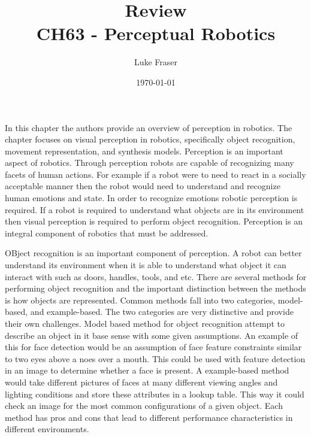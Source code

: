 \documentclass{article}
\begin{document}
\title{{\large Review} \\ CH63 - Perceptual Robotics}
\author{Luke Fraser}
\date{\today}
\maketitle

\begingroup
\renewcommand{\section}[2]{}


\endgroup

\section*{Summary}
In this chapter the authors provide an overview of perception in robotics. The chapter focuses on visual perception in robotics, specifically object recognition, movement representation, and synthesis models. Perception is an important aspect of robotics. Through perception robots are capable of recognizing many facets of human actions. For example if a robot were to need to react in a socially acceptable manner then the robot would need to understand and recognize human emotions and state. In order to recognize emotions robotic perception is required. If a robot is required to understand what objects are in its environment then visual perception is required to perform object recognition. Perception is an integral component of robotics that must be addressed.

OBject recognition is an important component of perception. A robot can better understand its environment when it is able to understand what object it can interact with such as doors, handles, tools, and etc. There are several methods for performing object recognition and the important distinction between the methods is how objects are represented. Common methods fall into two categories, model-based, and example-based. The two categories are very distinctive and provide their own challenges. Model based method for object recognition attempt to describe an object in it base sense with some given assumptions. An example of this for face detection would be an assumption of face feature constraints similar to two eyes above a noes over a mouth. This could be used with feature detection in an image to determine whether a face is present. A example-based method would take different pictures of faces at many different viewing angles and lighting conditions and store these attributes in a lookup table. This way it could check an image for the most common configurations of a given object. Each method has pros and cons that lead to different performance characteristics in different environments.
\end{document}

